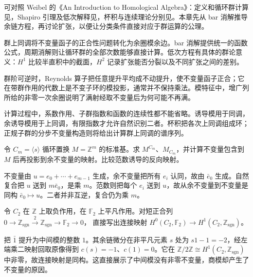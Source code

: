 \ProseParagraphBreak
可对照 Weibel 的《An Introduction to Homological Algebra》：定义和循环群计算见\cite[Sections 6.1--6.2]{Weibel1994HomologicalAlgebra}，Shapiro 引理及低次解释见\cite[Sections 6.3--6.6]{Weibel1994HomologicalAlgebra}，杯积与连续理论分别见\cite[Section 6.7.1, Section 6.11]{Weibel1994HomologicalAlgebra}。本章先从 bar 消解推导余链方程，再讨论扩张，以便让分类条件直接对应于群运算的公理。






\begin{chaptersummary}
	群上同调将不变量函子的正合性问题转化为余圈模余边。bar 消解提供统一的函数公式，周期消解则让循环群的全部次数能够直接计算。低次方程有具体的群论意义：\(H^1\) 比较半直积中的截面，\(H^2\) 记录扩张能否分裂以及不同扩张之间的差别。

	\ProseParagraphBreak
	群阶可逆时，Reynolds 算子把任意提升平均成不动提升，使不变量函子正合；它在带群作用的代数上是不变子环的模投影，通常并不保持乘法。模特征中，增广列所给的非零一次余圈说明了满射经取不变量后为何可能不再满。

	\ProseParagraphBreak
	计算过程中，系数作用、子群指数和函数的连续性都不能省略。诱导模用于同调，余诱导模用于上同调，有限指数才允许自然识别二者。杯积把各次上同调组成环；正规子群的分步不变量构造则将给出计算群上同调的谱序列。
\end{chaptersummary}

\BookExercises

\begin{exercise}\label{b4:ex:11-permutation-invariants}
	令 \(C_m=\langle s\rangle\) 循环置换 \(M=\mathbb Z^m\) 的标准基。求 \(M^{C_m}\)、\(M_{C_m}\)，并计算不变量包含到 \(M\) 后再投影到余不变量的映射。比较范数诱导的反向映射。
\end{exercise}
\begin{solution}
	不变量由 \(u=e_0+\cdots+e_{m-1}\) 生成，余不变量把所有 \(e_i\) 认同，故由 \(\bar e_0\) 生成。自然复合把 \(u\) 送到 \(m\bar e_0\)，是乘 \(m\)。范数则把每个 \(e_i\) 送到 \(u\)，故从余不变量到不变量是同构 \(\bar e_0\mapsto u\)。二者并非互逆，复合仍为乘 \(m\)。
\end{solution}

\begin{exercise}\label{b4:ex:11-connecting-sign}
	令 \(C_2\) 在 \(\mathbb Z\) 上取负作用，在 \(\mathbb F_2\) 上平凡作用。对短正合列 \(0\to\mathbb Z_{\mathrm{sgn}}\xrightarrow{2}\mathbb Z_{\mathrm{sgn}}\to\mathbb F_2\to0\)， 直接写出连接映射 \(H^0(C_2,\mathbb F_2)\to H^1(C_2,\mathbb Z_{\mathrm{sgn}})\)。
\end{exercise}
\begin{solution}
	把 \(\bar1\) 提升为中间模的整数 \(1\)。其余链微分在非平凡元素 \(s\) 处为 \(s1-1=-2\)，经左端乘二映射回取原像得到 \(c(s)=-1\)、\(c(1)=0\)。它在 \(\mathbb Z/2\mathbb Z\cong H^1(C_2,\mathbb Z_{\mathrm{sgn}})\) 中非零，故连接映射是同构。这直接展示了中间模没有非零不变量，商模却产生了不变量的原因。
\end{solution}

